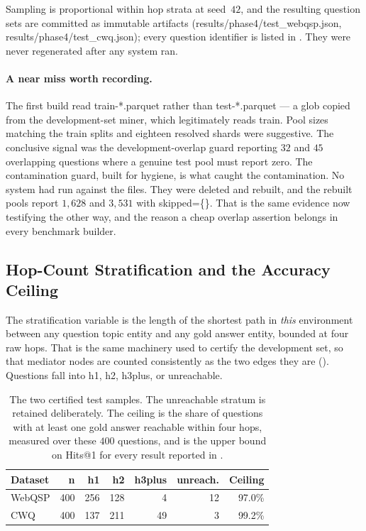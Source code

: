 Sampling is proportional within hop strata at seed~$42$, and the resulting
question sets are committed as immutable artifacts
(\textsf{results/phase4/test\_webqsp.json},
\textsf{results/phase4/test\_cwq.json}); every question identifier is listed in
. They were never regenerated after any system ran.

\paragraph{A near miss worth recording.} The first build read
\textsf{train-*.parquet}
rather than \textsf{test-*.parquet} --- a glob copied from the development-set
miner, which legitimately reads train. Pool sizes matching the train splits and
eighteen resolved shards were suggestive. The conclusive signal was the
development-overlap guard reporting $32$ and $45$ overlapping questions where a
genuine test pool must report zero. The contamination guard, built for hygiene,
is what caught the contamination. No system had run against the files. They were
deleted and rebuilt, and the rebuilt pools report $1{,}628$ and $3{,}531$ with
\textsf{skipped=\{\}}. That is the same evidence now testifying the other way,
and the reason a cheap overlap assertion belongs in every benchmark builder.

\subsection{Hop-Count Stratification and the Accuracy Ceiling}

The stratification variable is the length of the shortest
path in \emph{this} environment between any question topic entity and any gold
answer entity, bounded at four raw hops. That is the same machinery used to
certify the development set, so that mediator nodes are counted consistently as
the two edges they are (). Questions fall into
\textsf{h1}, \textsf{h2}, \textsf{h3plus}, or \textsf{unreachable}.

\begin{table}[!tb]
  \begin{center}
    \caption[The two certified test samples]{The two certified test samples. The
    unreachable stratum is retained deliberately. The ceiling is the share of
    questions with at least one gold answer reachable within four hops, measured
    over these $400$ questions, and is the upper bound on Hits@1 for every
    result reported in .}
    \label{tab:testsets}
    \begin{tabular}{|l|r|r|r|r|r|r|}
      \hline
      \textbf{Dataset} & \textbf{n} & \textbf{h1} & \textbf{h2} &
      \textbf{h3plus} & \textbf{unreach.} & \textbf{Ceiling} \\
      \hline
      WebQSP & 400 & 256 & 128 & 4  & 12 & 97.0\% \\
      CWQ    & 400 & 137 & 211 & 49 & 3  & 99.2\% \\
      \hline
    \end{tabular}
  \end{center}
\end{table}

